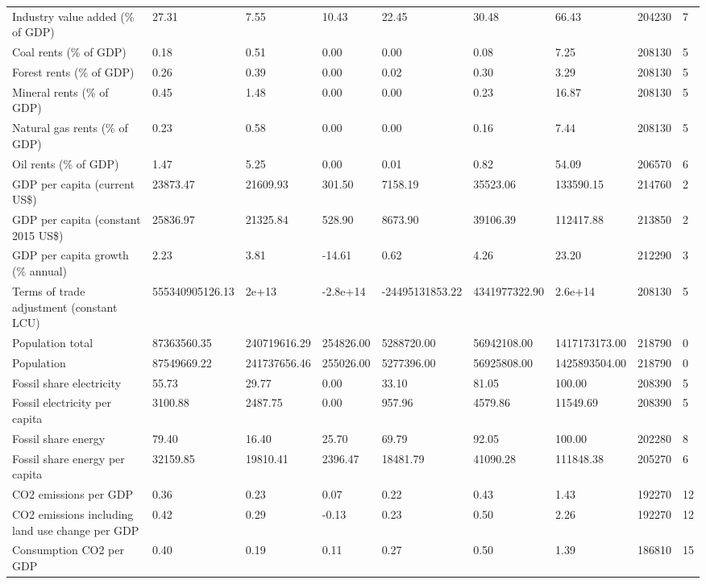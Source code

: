 \begin{longtable}{lllllllll}
Industry value added (\% of GDP) & 27.31 & 7.55 & 10.43 & 22.45 & 30.48 & 66.43 & 204230 & 7\\
Coal rents (\% of GDP) & 0.18 & 0.51 & 0.00 & 0.00 & 0.08 & 7.25 & 208130 & 5\\
Forest rents (\% of GDP) & 0.26 & 0.39 & 0.00 & 0.02 & 0.30 & 3.29 & 208130 & 5\\
Mineral rents (\% of GDP) & 0.45 & 1.48 & 0.00 & 0.00 & 0.23 & 16.87 & 208130 & 5\\
\addlinespace
Natural gas rents (\% of GDP) & 0.23 & 0.58 & 0.00 & 0.00 & 0.16 & 7.44 & 208130 & 5\\
Oil rents (\% of GDP) & 1.47 & 5.25 & 0.00 & 0.01 & 0.82 & 54.09 & 206570 & 6\\
GDP per capita (current US\$) & 23873.47 & 21609.93 & 301.50 & 7158.19 & 35523.06 & 133590.15 & 214760 & 2\\
GDP per capita (constant 2015 US\$) & 25836.97 & 21325.84 & 528.90 & 8673.90 & 39106.39 & 112417.88 & 213850 & 2\\
GDP per capita growth (\% annual) & 2.23 & 3.81 & -14.61 & 0.62 & 4.26 & 23.20 & 212290 & 3\\
\addlinespace
Terms of trade adjustment (constant LCU) & 555340905126.13 & 2e+13 & -2.8e+14 & -24495131853.22 & 4341977322.90 & 2.6e+14 & 208130 & 5\\
Population total & 87363560.35 & 240719616.29 & 254826.00 & 5288720.00 & 56942108.00 & 1417173173.00 & 218790 & 0\\
Population & 87549669.22 & 241737656.46 & 255026.00 & 5277396.00 & 56925808.00 & 1425893504.00 & 218790 & 0\\
Fossil share electricity & 55.73 & 29.77 & 0.00 & 33.10 & 81.05 & 100.00 & 208390 & 5\\
Fossil electricity per capita & 3100.88 & 2487.75 & 0.00 & 957.96 & 4579.86 & 11549.69 & 208390 & 5\\
\addlinespace
Fossil share energy & 79.40 & 16.40 & 25.70 & 69.79 & 92.05 & 100.00 & 202280 & 8\\
Fossil share energy per capita & 32159.85 & 19810.41 & 2396.47 & 18481.79 & 41090.28 & 111848.38 & 205270 & 6\\
CO2 emissions per GDP & 0.36 & 0.23 & 0.07 & 0.22 & 0.43 & 1.43 & 192270 & 12\\
CO2 emissions including land use change per GDP & 0.42 & 0.29 & -0.13 & 0.23 & 0.50 & 2.26 & 192270 & 12\\
Consumption CO2 per GDP & 0.40 & 0.19 & 0.11 & 0.27 & 0.50 & 1.39 & 186810 & 15\\

\end{longtable}
